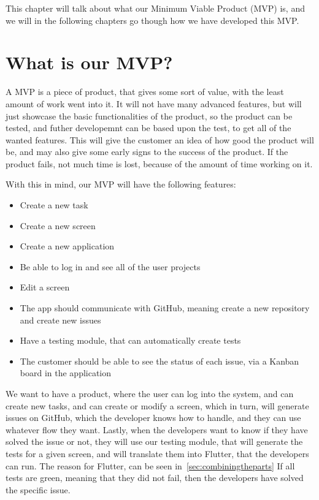 This chapter will talk about what our Minimum Viable Product (MVP) is, and we will in the following chapters go though how we have developed this MVP.

\section{What is our MVP?}
A MVP is a piece of product, that gives some sort of value, with the least amount of work went into it.
It will not have many advanced features, but will just showcase the basic functionalities of the product, so the product can be tested, and futher developemnt can be based upon the test, to get all of the wanted features.
This will give the customer an idea of how good the product will be, and may also give some early signs to the success of the product. 
If the product fails, not much time is lost, because of the amount of time working on it. \cite{whatIsMVP}

With this in mind, our MVP will have the following features:

\begin{itemize}
    \item Create a new task
    \item Create a new screen
    \item Create a new application
    \item Be able to log in and see all of the user projects
    \item Edit a screen 
    \item The app should communicate with GitHub, meaning create a new repository and create new issues
    \item Have a testing module, that can automatically create tests
    \item The customer should be able to see the status of each issue, via a Kanban board in the application
\end{itemize}

We want to have a product, where the user can log into the system, and can create new tasks, and can create or modify a screen, which in turn, will generate issues on GitHub, which the developer knows how to handle, and they can use whatever flow they want.
Lastly, when the developers want to know if they have solved the issue or not, they will use our testing module, that will generate the tests for a given screen, and will translate them into Flutter, that the developers can run. The reason for Flutter, can be seen in~\autoref{sec:combiningtheparts} 
If all tests are green, meaning that they did not fail, then the developers have solved the specific issue.
